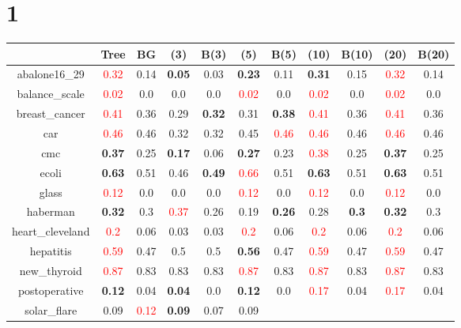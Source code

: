 \documentclass{article}%
\begin{document}
\section*{1}%
\begin{tabular}{c|cccccccccc}%
\hline%
&Tree&BG&(3)&B(3)&(5)&B(5)&(10)&B(10)&(20)&B(20)\\%
\hline%
abalone16\_29&\textcolor{red}{ 
0.32
}&0.14&\textbf{0.05}&0.03&\textbf{0.23}&0.11&\textbf{0.31}&0.15&\textcolor{red}{ 
0.32
}&0.14\\%
\hline%
balance\_scale&\textcolor{red}{ 
0.02
}&0.0&0.0&0.0&\textcolor{red}{ 
0.02
}&0.0&\textcolor{red}{ 
0.02
}&0.0&\textcolor{red}{ 
0.02
}&0.0\\%
\hline%
breast\_cancer&\textcolor{red}{ 
0.41
}&0.36&0.29&\textbf{0.32}&0.31&\textbf{0.38}&\textcolor{red}{ 
0.41
}&0.36&\textcolor{red}{ 
0.41
}&0.36\\%
\hline%
car&\textcolor{red}{ 
0.46
}&0.46&0.32&0.32&0.45&\textcolor{red}{ 
0.46
}&\textcolor{red}{ 
0.46
}&0.46&\textcolor{red}{ 
0.46
}&0.46\\%
\hline%
cmc&\textbf{0.37}&0.25&\textbf{0.17}&0.06&\textbf{0.27}&0.23&\textcolor{red}{ 
0.38
}&0.25&\textbf{0.37}&0.25\\%
\hline%
ecoli&\textbf{0.63}&0.51&0.46&\textbf{0.49}&\textcolor{red}{ 
0.66
}&0.51&\textbf{0.63}&0.51&\textbf{0.63}&0.51\\%
\hline%
glass&\textcolor{red}{ 
0.12
}&0.0&0.0&0.0&\textcolor{red}{ 
0.12
}&0.0&\textcolor{red}{ 
0.12
}&0.0&\textcolor{red}{ 
0.12
}&0.0\\%
\hline%
haberman&\textbf{0.32}&0.3&\textcolor{red}{ 
0.37
}&0.26&0.19&\textbf{0.26}&0.28&\textbf{0.3}&\textbf{0.32}&0.3\\%
\hline%
heart\_cleveland&\textcolor{red}{ 
0.2
}&0.06&0.03&0.03&\textcolor{red}{ 
0.2
}&0.06&\textcolor{red}{ 
0.2
}&0.06&\textcolor{red}{ 
0.2
}&0.06\\%
\hline%
hepatitis&\textcolor{red}{ 
0.59
}&0.47&0.5&0.5&\textbf{0.56}&0.47&\textcolor{red}{ 
0.59
}&0.47&\textcolor{red}{ 
0.59
}&0.47\\%
\hline%
new\_thyroid&\textcolor{red}{ 
0.87
}&0.83&0.83&0.83&\textcolor{red}{ 
0.87
}&0.83&\textcolor{red}{ 
0.87
}&0.83&\textcolor{red}{ 
0.87
}&0.83\\%
\hline%
postoperative&\textbf{0.12}&0.04&\textbf{0.04}&0.0&\textbf{0.12}&0.0&\textcolor{red}{ 
0.17
}&0.04&\textcolor{red}{ 
0.17
}&0.04\\%
\hline%
solar\_flare&0.09&\textcolor{red}{ 
0.12
}&\textbf{0.09}&0.07&0.09&\textcolor{red}{ 
}
\end{tabular}
\end{document}
